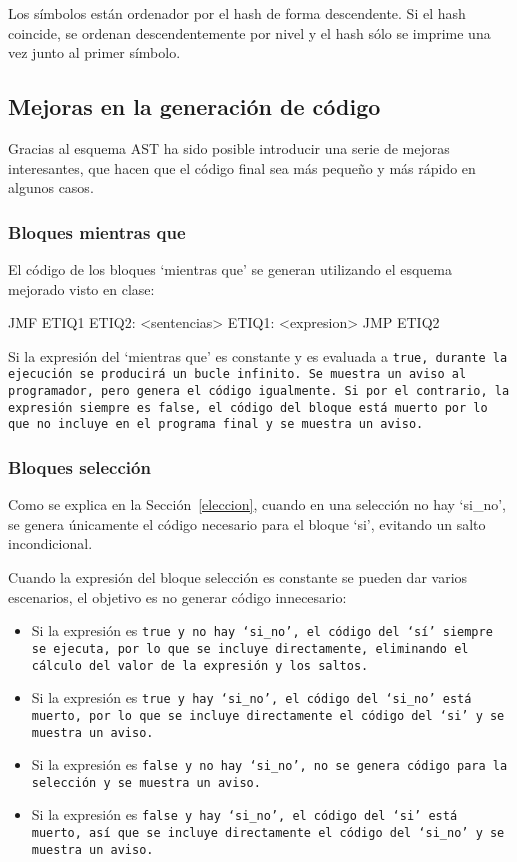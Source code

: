Los símbolos están ordenador por el hash de forma descendente. Si el hash coincide, se ordenan descendentemente por nivel y el hash sólo se imprime una vez junto al primer símbolo.


\subsection{Mejoras en la generación de código}
Gracias al esquema AST ha sido posible introducir una serie de mejoras interesantes, que hacen que el código final sea más pequeño y más rápido en algunos casos.

\subsubsection{Bloques mientras que}
El código de los bloques `mientras que' se generan utilizando el esquema mejorado visto en clase:

\begin{codigo}
        JMF ETIQ1
        ETIQ2:
          		<sentencias>
        ETIQ1:
        		<expresion>
        		JMP ETIQ2
\end{codigo}

Si la expresión del `mientras que' es constante y es evaluada a \tt{true}, durante la ejecución se producirá un bucle infinito. Se muestra un aviso al programador, pero genera el código igualmente. Si por el contrario, la expresión siempre es \tt{false}, el código del bloque está muerto por lo que no incluye en el programa final y se muestra un aviso.

\subsubsection{Bloques selección}
Como se explica en la Sección~\ref{eleccion}, cuando en una selección no hay `si\_no', se genera únicamente el código necesario para el bloque `si', evitando un salto incondicional.

Cuando la expresión del bloque selección es constante se pueden dar varios escenarios, el objetivo es no generar código innecesario:

\begin{itemize}
    \item Si la expresión es \tt{true} y no hay `si\_no', el código del `sí' siempre se ejecuta, por lo que se incluye directamente, eliminando el cálculo del valor de la expresión y los saltos.
    \item Si la expresión es \tt{true} y hay `si\_no', el código del `si\_no' está muerto, por lo que se incluye directamente el código del `si' y se muestra un aviso.
    \item Si la expresión es \tt{false} y no hay `si\_no', no se genera código para la selección y se muestra un aviso.
    \item Si la expresión es \tt{false} y hay `si\_no', el código del `si' está muerto, así que se incluye directamente el código del `si\_no' y se muestra un aviso.
\end{itemize}

